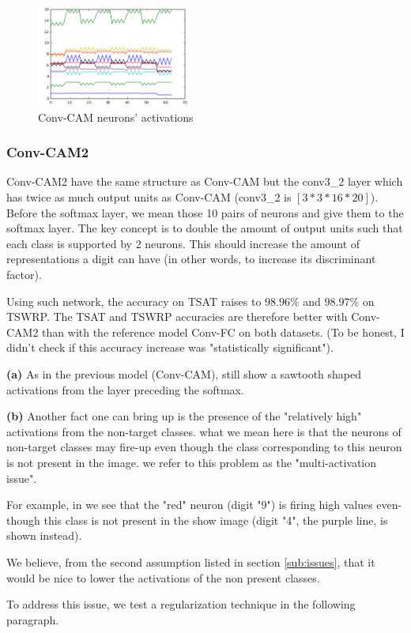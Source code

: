 				\begin{figure}[h]
					\centering
					\includegraphics[width=0.45\textwidth]{images/multiPosGraphConvCAM}
					\caption{Conv-CAM neurons' activations}
					\label{fig:multipose_graph_CAM}
				\end{figure}

			\subsubsection{Conv-CAM2}
			\label{ssub:conv_cam2}
				Conv-CAM2 have the same structure as Conv-CAM but the conv3\_2 layer which has twice as much output units as Conv-CAM (conv3\_2 is $[3*3*16*20]$). Before the softmax layer, we mean those 10 pairs of neurons and give them to the softmax layer. The key concept is to double the amount of output units such that each class is supported by 2 neurons. This should increase the amount of representations a digit can have (in other words, to increase its discriminant factor).

				Using such network, the accuracy on TSAT raises to $98.96\%$ and $98.97\%$ on TSWRP. The TSAT and TSWRP accuracies are therefore better with Conv-CAM2 than with the reference model Conv-FC on both datasets. (To be honest, I didn't check if this accuracy increase was "statistically significant").

				\begin{mdframed}[backgroundcolor = gray!30]
					\textbf{(a)} As in the previous model (Conv-CAM),  still show a sawtooth shaped activations from the layer preceding the softmax.

					\vspace{1em}
					\textbf{(b)} Another fact one can bring up is the presence of the "relatively high" activations from the non-target classes. what we mean here is that the neurons of non-target classes may fire-up even though the class corresponding to this neuron is not present in the image. we refer to this problem as the "multi-activation issue".

					For example, in  we see that the "red" neuron (digit "9") is firing high values even-though this class is not present in the show image (digit "4", the purple line, is shown instead).

					We believe, from the second assumption listed in section \ref{sub:issues}, that it would be nice to lower the activations of the non present classes.

					To address this issue, we test a regularization technique in the following paragraph.
				\end{mdframed}
		
